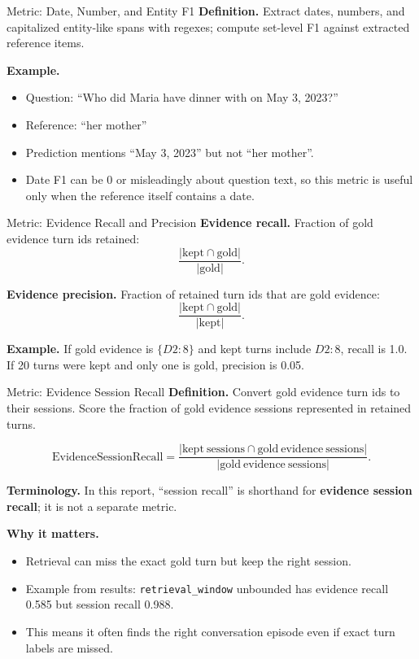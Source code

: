 \documentclass[aspectratio=169]{beamer}
\newcommand{\method}[1]{\texttt{#1}}
\newcommand{\metric}[1]{\textbf{#1}}
\begin{document}
\begin{frame}{Metric: Date, Number, and Entity F1}
\metric{Definition.} Extract dates, numbers, and capitalized entity-like spans with regexes; compute set-level F1 against extracted reference items.

\vspace{0.5em}
\metric{Example.}
\begin{itemize}
  \item Question: ``Who did Maria have dinner with on May 3, 2023?''
  \item Reference: ``her mother''
  \item Prediction mentions ``May 3, 2023'' but not ``her mother''.
  \item Date F1 can be 0 or misleadingly about question text, so this metric is useful only when the reference itself contains a date.
\end{itemize}
\end{frame}

\begin{frame}{Metric: Evidence Recall and Precision}
\metric{Evidence recall.} Fraction of gold evidence turn ids retained:
\[
\frac{|\mathrm{kept} \cap \mathrm{gold}|}{|\mathrm{gold}|}.
\]

\metric{Evidence precision.} Fraction of retained turn ids that are gold evidence:
\[
\frac{|\mathrm{kept} \cap \mathrm{gold}|}{|\mathrm{kept}|}.
\]

\vspace{0.5em}
\metric{Example.}
If gold evidence is \(\{D2{:}8\}\) and kept turns include \(D2{:}8\), recall is 1.0. If 20 turns were kept and only one is gold, precision is 0.05.
\end{frame}

\begin{frame}{Metric: Evidence Session Recall}
\metric{Definition.} Convert gold evidence turn ids to their sessions. Score the fraction of gold evidence sessions represented in retained turns.

\[
\mathrm{EvidenceSessionRecall}
= \frac{|\mathrm{kept\ sessions} \cap \mathrm{gold\ evidence\ sessions}|}
{|\mathrm{gold\ evidence\ sessions}|}.
\]

\vspace{0.25em}
\metric{Terminology.} In this report, ``session recall'' is shorthand for \metric{evidence session recall}; it is not a separate metric.

\vspace{0.5em}
\metric{Why it matters.}
\begin{itemize}
  \item Retrieval can miss the exact gold turn but keep the right session.
  \item Example from results: \method{retrieval\_window} unbounded has evidence recall 0.585 but session recall 0.988.
  \item This means it often finds the right conversation episode even if exact turn labels are missed.
\end{itemize}
\end{frame}
\end{document}
